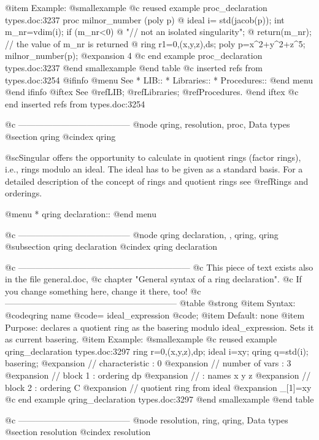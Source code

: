 {{{{{{@item Example:
@smallexample
@c reused example proc_declaration types.doc:3237 
  proc milnor_number (poly p)
  @{
    ideal i= std(jacob(p));
    int m_nr=vdim(i);
    if (m_nr<0)
    @{
      "// not an isolated singularity";
    @}
    return(m_nr);         // the value of m_nr is returned
  @}
  ring r1=0,(x,y,z),ds;
  poly p=x^2+y^2+z^5;
  milnor_number(p);
@expansion{} 4
@c end example proc_declaration types.doc:3237
@end smallexample
@end table
@c inserted refs from types.doc:3254
@ifinfo
@menu
See
* LIB::
* Libraries::
* Procedures::
@end menu
@end ifinfo
@iftex
See
@ref{LIB};
@ref{Libraries};
@ref{Procedures}.
@end iftex
@c end inserted refs from types.doc:3254



@c ---------------------------------------
@node qring, resolution, proc, Data types
@section qring
@cindex qring

@sc{Singular} offers the opportunity to calculate in quotient rings
(factor rings), i.e., rings modulo an ideal.  The ideal has to be given
as a standard basis.  For a detailed description of the concept
of rings and quotient rings see @ref{Rings and orderings}.

@menu
* qring declaration::
@end menu

@c ---------------------------------------
@node qring declaration,  , qring, qring
@subsection qring declaration
@cindex qring declaration

@c ------------------------------------------------------------
@c   This piece of text exists also in the file general.doc,
@c   chapter "General syntax of a ring declaration".
@c   If you change something here, change it there, too!
@c ------------------------------------------------------------
@table @strong
@item Syntax:
@code{qring} name @code{=} ideal_expression @code{;}
@item Default:
none
@item Purpose:
declares a quotient ring as the basering modulo ideal_expression.  Sets
it as current basering.
@item Example:
@smallexample
@c reused example qring_declaration types.doc:3297 
ring r=0,(x,y,z),dp;
ideal i=xy;
qring q=std(i);
basering;
@expansion{} //   characteristic : 0
@expansion{} //   number of vars : 3
@expansion{} //        block   1 : ordering dp
@expansion{} //                  : names    x y z 
@expansion{} //        block   2 : ordering C
@expansion{} // quotient ring from ideal
@expansion{} _[1]=xy
@c end example qring_declaration types.doc:3297
@end smallexample
@end table

@c ---------------------------------------
@node resolution, ring, qring, Data types
@section resolution
@cindex resolution

}}}}}}
